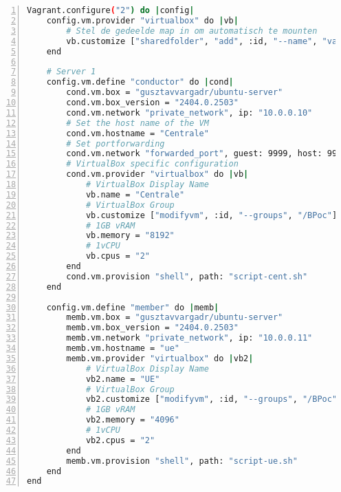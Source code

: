 \section{}
\begin{lstlisting}[basicstyle=\small, frame=single, breaklines=true, postbreak=\mbox{\textcolor{red}{$\hookrightarrow$}\space}, escapeinside ={\%,}, escapechar={!}, numbers=left, language=sh, caption=Vagrantfile]
Vagrant.configure("2") do |config|
    config.vm.provider "virtualbox" do |vb|
        # Stel de gedeelde map in om automatisch te mounten
        vb.customize ["sharedfolder", "add", :id, "--name", "vagrant_data", "--hostpath", ".", "--automount"]
    end

    # Server 1
    config.vm.define "conductor" do |cond|
        cond.vm.box = "gusztavvargadr/ubuntu-server"
        cond.vm.box_version = "2404.0.2503"
        cond.vm.network "private_network", ip: "10.0.0.10"
        # Set the host name of the VM
        cond.vm.hostname = "Centrale"
        # Set portforwarding
        cond.vm.network "forwarded_port", guest: 9999, host: 9999, host_ip: "127.0.0.1", id: "open5gs"
        # VirtualBox specific configuration
        cond.vm.provider "virtualbox" do |vb|
            # VirtualBox Display Name
            vb.name = "Centrale"
            # VirtualBox Group
            vb.customize ["modifyvm", :id, "--groups", "/BPoc"]
            # 1GB vRAM
            vb.memory = "8192"
            # 1vCPU
            vb.cpus = "2"
        end
        cond.vm.provision "shell", path: "script-cent.sh"
    end

    config.vm.define "member" do |memb|
        memb.vm.box = "gusztavvargadr/ubuntu-server"
        memb.vm.box_version = "2404.0.2503"
        memb.vm.network "private_network", ip: "10.0.0.11"
        memb.vm.hostname = "ue"
        memb.vm.provider "virtualbox" do |vb2|
            # VirtualBox Display Name
            vb2.name = "UE"
            # VirtualBox Group
            vb2.customize ["modifyvm", :id, "--groups", "/BPoc"]
            # 1GB vRAM
            vb2.memory = "4096"
            # 1vCPU
            vb2.cpus = "2"
        end
        memb.vm.provision "shell", path: "script-ue.sh"
    end
end
\end{lstlisting}

\section{}

